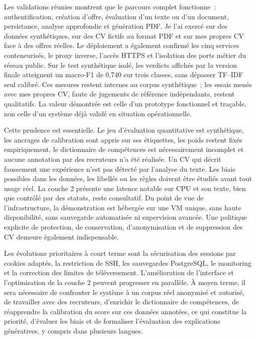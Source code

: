 Les validations réunies montrent que le parcours complet fonctionne~: authentification, création d'offre, évaluation d'un texte ou d'un document, persistance, analyse approfondie et génération PDF. Je l'ai exercé sur des données synthétiques, sur des CV fictifs au format PDF et sur mes propres CV face à des offres réelles. Le déploiement a également confirmé les cinq services conteneurisés, le proxy inverse, l'accès HTTPS et l'isolation des ports métier du réseau public. Sur le test synthétique isolé, les verdicts affichés par la version finale atteignent un macro-F1 de 0,740 sur trois classes, sans dépasser TF--IDF seul calibré. Ces mesures restent internes au corpus synthétique~; les essais menés avec mes propres CV, faute de jugements de référence indépendants, restent qualitatifs. La valeur démontrée est celle d'un prototype fonctionnel et traçable, non celle d'un système déjà validé en situation opérationnelle.

Cette prudence est essentielle. Le jeu d'évaluation quantitative est synthétique, les ancrages de calibration sont appris sur ses étiquettes, les poids restent fixés empiriquement, le dictionnaire de compétences est nécessairement incomplet et aucune annotation par des recruteurs n'a été réalisée. Un CV qui décrit faussement une expérience n'est pas détecté par l'analyse du texte. Les biais possibles dans les données, les libellés ou les règles doivent être étudiés avant tout usage réel. La couche 2 présente une latence notable sur CPU et son texte, bien que contrôlé par des statuts, reste consultatif. Du point de vue de l'infrastructure, la démonstration est hébergée sur une VM unique, sans haute disponibilité, sans sauvegarde automatisée ni supervision avancée. Une politique explicite de protection, de conservation, d'anonymisation et de suppression des CV demeure également indispensable.

Les évolutions prioritaires à court terme sont la sécurisation des sessions par cookies adaptés, la restriction de SSH, les sauvegardes PostgreSQL, le monitoring et la correction des limites de téléversement. L'amélioration de l'interface et l'optimisation de la couche 2 peuvent progresser en parallèle. À moyen terme, il sera nécessaire de confronter le système à un corpus réel anonymisé et autorisé, de travailler avec des recruteurs, d'enrichir le dictionnaire de compétences, de réapprendre la calibration du score sur ces données annotées, ce qui constitue la priorité, d'évaluer les biais et de formaliser l'évaluation des explications génératives, y compris dans plusieurs langues.

